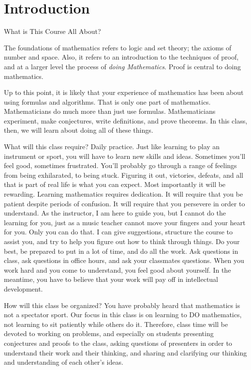 \chapter{Introduction}\label{chap:intro}

\begin{section}{What is This Course All About?}%

The foundations of mathematics refers to logic and set theory; the axioms of number and space.  Also, it refers to an introduction to the techniques of proof, and at a larger level the process of \emph{doing Mathematics}.  Proof is central to doing mathematics.

Up to this point, it is likely that your experience of mathematics has been about using formulas and algorithms. That is only one part of mathematics. Mathematicians do much more than just use formulas.  Mathematicians experiment, make conjectures, write definitions, and prove theorems.  In this class, then, we will learn about doing all of these things.

What will this class require?  Daily practice.  Just like learning to play an instrument or sport, you will have to learn new skills and ideas.  Sometimes you'll feel good, sometimes frustrated.  You'll probably go through a range of feelings from being exhilarated, to being stuck.  Figuring it out, victories, defeats, and all that is part of real life is what you can expect.  Most importantly it will be rewarding.  Learning mathematics requires dedication.  It will require that you be patient despite periods of confusion.  It will require that you persevere in order to understand.  As the instructor, I am here to guide you, but I cannot do the learning for you, just as a music teacher cannot move your fingers and your heart for you.  Only you can do that.  I can give suggestions, structure the course to assist you, and try to help you figure out how to think through things.  Do your best, be prepared to put in a lot of time, and do all the work.  Ask questions in class, ask questions in office hours, and ask your classmates questions.  When you work hard and you come to understand, you feel good about yourself.  In the meantime, you have to believe that your work will pay off in intellectual development.

How will this class be organized?  You have probably heard that mathematics is not a spectator sport.  Our focus in this class is on learning to DO mathematics, not learning to sit patiently while others do it.  Therefore, class time will be devoted to working on problems, and especially on students presenting conjectures and proofs to the class, asking questions of presenters in order to understand their work and their thinking, and sharing and clarifying our thinking and understanding of each other's ideas.  


\end{section}

